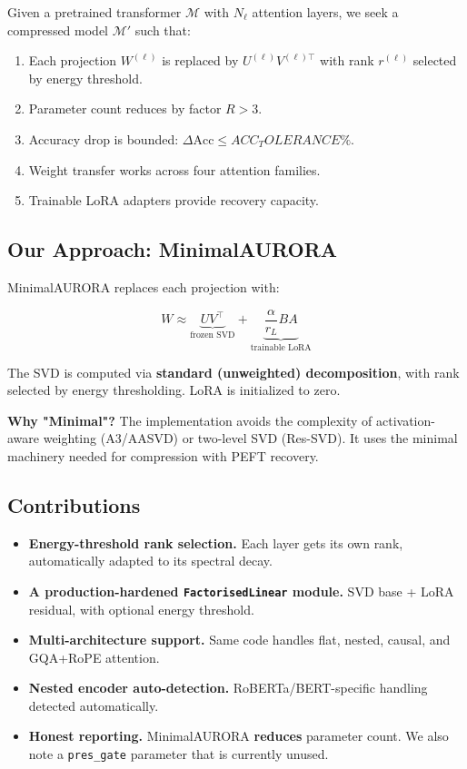 Given a pretrained transformer $\mathcal{M}$ with $N_\ell$ attention layers, 
we seek a compressed model $\mathcal{M}'$ such that:

\begin{enumerate}
\item Each projection $W^{(\ell)}$ is replaced by $U^{(\ell)} V^{(\ell)\top}$
  with rank $r^{(\ell)}$ selected by energy threshold.
\item Parameter count reduces by factor $R > 3$.
\item Accuracy drop is bounded: $\Delta\text{Acc} \leq {{ACC_TOLERANCE}}\%$.
\item Weight transfer works across four attention families.
\item Trainable LoRA adapters provide recovery capacity.

\end{enumerate}
\subsection{Our Approach: MinimalAURORA}

MinimalAURORA replaces each projection with:

\[
W \approx \underbrace{U V^\top}_{\text{frozen SVD}} + \underbrace{\frac{\alpha}{r_L} B A}_{\text{trainable LoRA}}
\tag{1.2}
\]

The SVD is computed via \textbf{standard (unweighted) decomposition}, with rank 
selected by energy thresholding. LoRA is initialized to zero.

\textbf{Why "Minimal"?} The implementation avoids the complexity of 
activation-aware weighting (A3/AASVD) or two-level SVD (Res-SVD). It uses 
the minimal machinery needed for compression with PEFT recovery.

\subsection{Contributions}

\begin{itemize}
\item \textbf{Energy-threshold rank selection.} Each layer gets its own rank,
  automatically adapted to its spectral decay.
\item \textbf{A production-hardened \texttt{FactorisedLinear} module.} SVD base + LoRA
  residual, with optional energy threshold.
\item \textbf{Multi-architecture support.} Same code handles flat, nested, causal,
  and GQA+RoPE attention.
\item \textbf{Nested encoder auto-detection.} RoBERTa/BERT-specific handling
  detected automatically.
\item \textbf{Honest reporting.} MinimalAURORA \textbf{reduces} parameter count. We also
  note a \texttt{pres\_gate} parameter that is currently unused.

\end{itemize}
